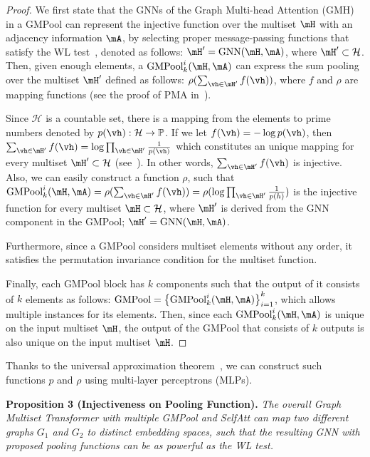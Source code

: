 \begin{proof}
We first state that the GNNs of the Graph Multi-head Attention (GMH) in a GMPool can represent the injective function over the multiset $\mH$ with an adjacency information $\mA$, by selecting proper message-passing functions that satisfy the WL test~\citep{GIN, WL/GNN}, denoted as follows: $\mH' = \text{GNN}(\mH, \mA)$, where $\mH' \subset \mathcal{H}$. Then, given enough elements, a $\text{GMPool}_{k}^i(\mH, \mA)$ can express the sum pooling over the multiset $\mH'$ defined as follows: $\rho (\sum_{\vh \in \mH'} f(\vh))$, where $f$ and $\rho$ are mapping functions (see the proof of PMA in~\citet{SetTransformer}). 


Since $\mathcal{H}$ is a countable set, there is a mapping from the elements to prime numbers denoted by $p(\vh): \mathcal{H} \rightarrow \mathbb{P}$. If we let $f(\vh) = -\log p(\vh)$, then $\sum_{\vh \in \mH'} f(\vh) = \log \prod_{\vh \in \mH'} \frac{1}{p(\vh)}$ which constitutes an unique mapping for every multiset $\mH' \subset \mathcal{H}$ (see~\citet{multiset/injective}). In other words, $\sum_{\vh \in \mH'} f(\vh)$ is injective. Also, we can easily construct a function $\rho$, such that $\text{GMPool}_{k}^i(\mH, \mA) = \rho (\sum_{\vh \in \mH'} f(\vh)) = \rho (\log \prod_{\vh \in \mH'} \frac{1}{p(h)})$ is the injective function for every multiset $\mH \subset \mathcal{H}$, where $\mH'$ is derived from the GNN component in the GMPool; $\mH' = \text{GNN}(\mH, \mA)$.

Furthermore, since a $\text{GMPool}$ considers multiset elements without any order, it satisfies the permutation invariance condition for the multiset function.

Finally, each $\text{GMPool}$ block has $k$ components such that the output of it consists of $k$ elements as follows: $\text{GMPool} = \left\{ \text{GMPool}_{k}^i(\mH, \mA) \right\}_{i=1}^k$, which allows multiple instances for its elements. Then, since each $\text{GMPool}_{k}^i(\mH, \mA)$ is unique on the input multiset $\mH$, the output of the $\text{GMPool}$ that consists of $k$ outputs is also unique on the input multiset $\mH$.
\end{proof}

Thanks to the universal approximation theorem~\citep{univ/approx}, we can construct such functions $p$ and $\rho$ using multi-layer perceptrons (MLPs).


\textbf{Proposition 3 (Injectiveness on Pooling Function).} 
\emph{The overall Graph Multiset Transformer with multiple GMPool and SelfAtt can map two different graphs $G_1$ and $G_2$ to distinct embedding spaces, such that the resulting GNN with proposed pooling functions can be as powerful as the WL test.}

